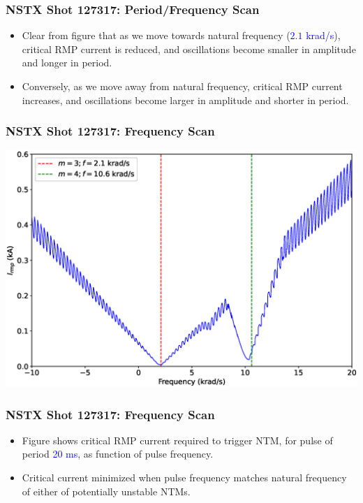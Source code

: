 \documentclass{beamer}
\newcommand{\blue}[1]{\textcolor{blue}{#1}}
\begin{document}
\begin{frame}
\frametitle{NSTX Shot 127317: Period/Frequency Scan}
\begin{itemize}
\item Clear from figure that as we move towards natural frequency (\blue{$2.1$ krad/s}), critical RMP current
is reduced, and oscillations become smaller in amplitude and longer in period.
\item Conversely, as we move away from  natural frequency, critical RMP current
increases, and oscillations become larger in amplitude and shorter in period.

\end{itemize}
\end{frame}

\begin{frame}
\frametitle{NSTX Shot 127317: Frequency Scan}

\begin{center}
\includegraphics[width=\textwidth]{FrequencyScan.eps}
\end{center}

\end{frame}

\begin{frame}
\frametitle{NSTX Shot 127317: Frequency Scan}
\begin{itemize}
\item Figure shows critical RMP current required to trigger NTM, for pulse of period \blue{20 ms}, as
function of pulse frequency. 
\item Critical current minimized when pulse frequency matches natural frequency of either of potentially
unstable NTMs. 

\end{itemize}
\end{frame}
\end{document}
